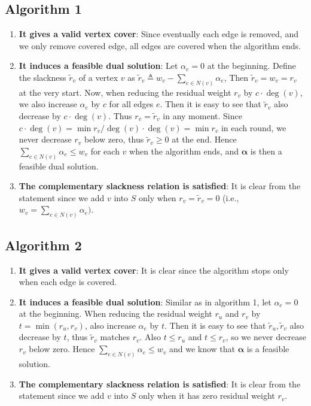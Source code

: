 \documentclass[12pt, a4paper]{article}
\newcommand{\defeq}{\triangleq}
\begin{document}
\subsection{Algorithm 1}
\begin{enumerate}
  \item {\bf It gives a valid vertex cover}: Since eventually each edge is removed,
    and we only remove covered edge, all edges are covered when the algorithm ends.
  \item {\bf It induces a feasible dual solution}: Let $\alpha_e = 0$ at the beginning.
    Define the slackness $\tilde{r}_v$ of a vertex $v$ as $\tilde{r}_v \defeq w_v - \sum_{e \in N(v)} \alpha_e$,
    Then $\tilde{r}_v = w_v = r_v$ at the very start. Now, when reducing the residual
    weight $r_v$ by $c \cdot \deg(v)$, we also increase $\alpha_e$ by $c$ for all edges $e$. Then
    it is easy to see that $\tilde{r}_v$ also decrease by $c \cdot \deg(v)$. Thus $r_v = \tilde{r}_v$
    in any moment. Since $c \cdot \deg(v) = \min r_v / \deg(v) \cdot \deg(v) = \min r_v$ in each round,
    we never decrease $r_v$ below zero, thus $\tilde{r}_v \geq 0$ at the end. Hence
    $\sum_{e \in N(v)} \alpha_e \leq w_v$ for each $v$ when the algorithm ends, and $\bm{\alpha}$
    is then a feasible dual solution.
  \item {\bf The complementary slackness relation is satisfied}: It is clear from the statement
    since we add $v$ into $S$ only when $r_v = \tilde{r}_v = 0$ (i.e., $w_v = \sum_{e \in N(v)} \alpha_e)$.
\end{enumerate}

\subsection{Algorithm 2}
\begin{enumerate}
  \item {\bf It gives a valid vertex cover}: It is clear since the algorithm stops
    only when each edge is covered.
  \item {\bf It induces a feasible dual solution}: Similar as in algorithm 1, let $\alpha_e = 0$ at the beginning.
    When reducing the residual weight $r_u$ and $r_v$ by $t = \min(r_u, r_v)$,
    also increase $\alpha_e$ by $t$.
    Then it is easy to see that $\tilde{r}_u, \tilde{r}_v$ also decrease by $t$, thus $\tilde{r}_v$ matches $r_v$.
    Also $t \leq r_u$ and $t \leq r_v$, so we never decrease $r_v$ below zero. Hence
    $\sum_{e \in N(v)} \alpha_e \leq w_v$ and we know that $\bm\alpha$ is a feasible solution.
  \item {\bf The complementary slackness relation is satisfied}: It is clear from the statement
    since we add $v$ into $S$ only when it has zero residual weight $r_v$.

\end{enumerate}
\end{document}
